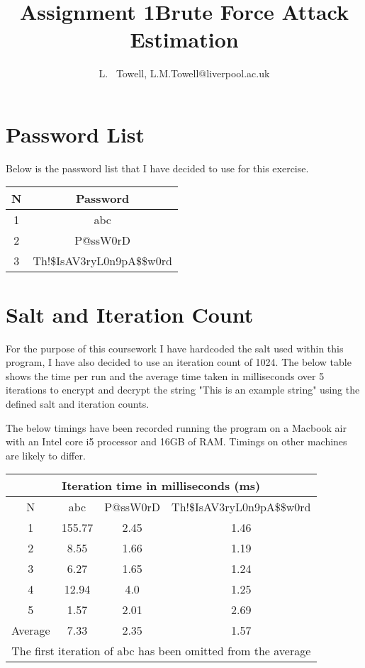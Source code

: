 \documentclass[a4paper, twoside, 11pt]{article}
\author{L. ~Towell, L.M.Towell@liverpool.ac.uk}
\title{Assignment 1\break Brute Force Attack Estimation}
\begin{document}
	\maketitle

\maketitle
\section{Password List}
Below is the password list that I have decided to use for this exercise.
\begin{center}
	\begin{tabular}{ |c|c| } 
	 \hline
	 N & Password \\
	 \hline
	 1 & abc \\ 
	 2 & P@ssW0rD \\ 
	 3 & Th!\$IsAV3ryL0n9pA\$\$w0rd \\ 
	 \hline
	\end{tabular}
\end{center}

\section{Salt and Iteration Count}
For the purpose of this coursework I have hardcoded the salt used within this program, 
I have also decided to use an iteration count of 1024. The below table shows the time per run and the average time
 taken in milliseconds over 5 iterations to encrypt and decrypt the string "This is an example string" using the 
 defined salt and iteration counts.

 The below timings have been recorded running the program on a Macbook air with an Intel core i5 processor and 16GB of RAM. Timings on other machines are likely to differ.
 \begin{center}
	\begin{tabular}{ |c|c|c|c| } 
	 \hline
	 \multicolumn{4}{|c|}{Iteration time in milliseconds (ms)} \\
	 \hline
	 N & abc & P@ssW0rD & Th!\$IsAV3ryL0n9pA\$\$w0rd \\
	 \hline
	 1 & 155.77 & 2.45 & 1.46 \\ 
	 2 & 8.55 & 1.66 & 1.19  \\ 
	 3 & 6.27 & 1.65 & 1.24  \\ 
	 4 & 12.94 & 4.0 & 1.25 \\
	 5 & 1.57 & 2.01 & 2.69  \\
	 \hline
	 \hline
	 Average & 7.33 & 2.35 & 1.57  \\
	 \hline
	 \multicolumn{4}{|c|}{The first iteration of abc has been omitted from the average} \\
	 \hline
	\end{tabular}
\end{center}
\end{document}
